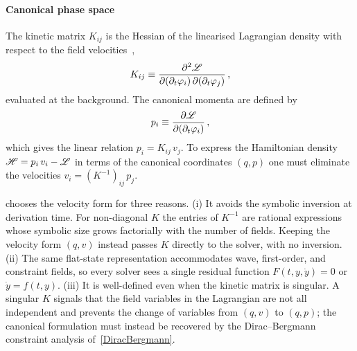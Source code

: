 \paragraph*{Canonical phase space}
The kinetic matrix $K_{ij}$ is the Hessian of the linearised
Lagrangian density with respect to the field
velocities~\cite{henneaux1992quantization},
\begin{align}
  K_{ij} \equiv \frac{\partial^2 \mathscr{L}}{\partial(\partial_t \varphi_i)\,
    \partial(\partial_t \varphi_j)}
  \, ,
  \label{KineticMatrixDef}
\end{align}
evaluated at the background. The canonical momenta are defined by
\begin{align}
  p_i \equiv \frac{\partial \mathscr{L}}{\partial(\partial_t \varphi_i)}
  \, ,
  \label{CanonicalMomenta}
\end{align}
which gives the linear
relation $p_i = K_{ij}\, v_j$. To express the Hamiltonian density
$\mathscr{H} = p_i\, v_i - \mathscr{L}$ in terms of the canonical coordinates $(q, p)$
one must
eliminate the velocities $v_i = (K^{-1})_{ij}\, p_j$.

\TIDAL{} chooses the velocity form for three reasons. (i) It avoids
the symbolic inversion at derivation time. For
non-diagonal $K$ the entries of $K^{-1}$ are rational expressions
whose symbolic size grows factorially with the number of fields.
Keeping the velocity form $(q, v)$ instead passes $K$ directly to the
solver, with no inversion. (ii) The same flat-state representation
accommodates wave, first-order, and constraint fields, so every
solver sees a single residual function $F(t, y, \dot y) = 0$ or
$\dot y = f(t, y)$.
(iii) It is well-defined even when the kinetic matrix is singular.
A singular $K$ signals that the field variables in
the Lagrangian are not all independent and prevents the
change of variables from $(q, v)$ to $(q, p)$; the
canonical formulation must instead be recovered by the
Dirac--Bergmann constraint analysis of~\cref{DiracBergmann}.


